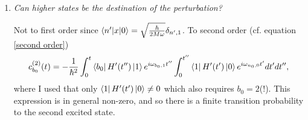 \begin{example}
\begin{enumerate}
		\item \emph{Can higher states be the destination of the perturbation?}\newline
		
		Not to first order since $\braket{n'|x|0}=\sqrt{\frac{\hbar}{2M\omega}}\delta_{n',1}$. To second order (cf. equation \eqref{second order})
		\begin{equation}
			\begin{split}
				c^{(2)}_{b_0}(t)&=-\frac{1}{\hbar^2}\int_{0}^{t}\bra{b_0}H'(t'')\ket{1}e^{i\omega_{b_0,1}t''}\int_{0}^{t''}\bra{1}H'(t')\ket{0}e^{i\omega_{n_0,0}t'}dt'dt'',
				\\
			\end{split}
		\end{equation} 
		where I used that only $\bra{1}H'(t')\ket{0}\neq0$ which also requires $b_0=2$(!). This expression is in general non-zero, and so there is a finite transition probability to the second excited state.
	\end{enumerate}
\end{example}
